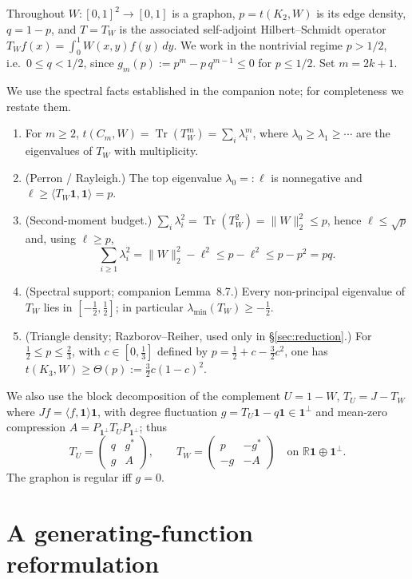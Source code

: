\documentclass[11pt]{article}
\theoremstyle{definition}
\newcommand{\Tr}{\operatorname{Tr}}
\newcommand{\1}{\mathbf{1}}
\newcommand{\R}{\mathbb{R}}
\begin{document}
Throughout $W:[0,1]^2\to[0,1]$ is a graphon, $p=t(K_2,W)$ is its edge density,
$q=1-p$, and $T=T_W$ is the associated self-adjoint Hilbert--Schmidt operator
$T_Wf(x)=\int_0^1 W(x,y)f(y)\,dy$. We work in the nontrivial regime $p>1/2$,
i.e.\ $0\le q<1/2$, since $g_m(p):=p^m-p\,q^{m-1}\le 0$ for $p\le 1/2$. Set
$m=2k+1$.

We use the spectral facts established in the companion note; for completeness we
restate them.
\begin{enumerate}[label=(S\arabic*)]
\item For $m\ge 2$, $t(C_m,W)=\Tr(T_W^m)=\sum_i\lambda_i^m$, where
$\lambda_0\ge\lambda_1\ge\cdots$ are the eigenvalues of $T_W$ with multiplicity.
\item (Perron / Rayleigh.) The top eigenvalue $\lambda_0=:\ell$ is nonnegative
and $\ell\ge\langle T_W\1,\1\rangle=p$.
\item (Second-moment budget.) $\sum_i\lambda_i^2=\Tr(T_W^2)=\|W\|_2^2\le p$, hence
$\ell\le\sqrt p$ and, using $\ell\ge p$,
\[
\sum_{i\ge1}\lambda_i^2=\|W\|_2^2-\ell^2\le p-\ell^2\le p-p^2=pq.
\]
\item (Spectral support; companion Lemma~8.7.) Every non-principal eigenvalue of
$T_W$ lies in $[-\tfrac12,\tfrac12]$; in particular $\lambda_{\min}(T_W)\ge-\tfrac12$.
\item (Triangle density; Razborov--Reiher, used only in
\S\ref{sec:reduction}.) For $\tfrac12\le p\le\tfrac23$, with $c\in[0,\tfrac13]$
defined by $p=\tfrac12+c-\tfrac32c^2$, one has $t(K_3,W)\ge\Theta(p):=\tfrac32c(1-c)^2$.
\end{enumerate}

We also use the block decomposition of the complement $U=1-W$, $T_U=J-T_W$ where
$Jf=\langle f,\1\rangle\1$, with degree fluctuation $g=T_U\1-q\1\in\1^\perp$ and
mean-zero compression $A=P_{\1^\perp}T_UP_{\1^\perp}$; thus
\[
T_U=\begin{pmatrix} q & g^*\\ g & A\end{pmatrix},
\qquad
T_W=\begin{pmatrix} p & -g^*\\ -g & -A\end{pmatrix}
\quad\text{on }\R\1\oplus\1^\perp .
\]
The graphon is regular iff $g=0$.

\section{A generating-function reformulation}\label{sec:genfun}
\end{document}
